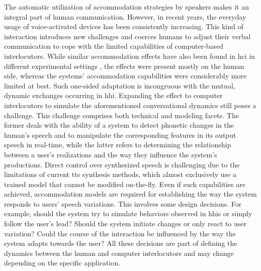 The automatic utilization of accommodation strategies by speakers makes it an integral part of human communication.
However, in recent years, the everyday usage of voice-activated devices has been consistently increasing.
This kind of interaction introduces new challenges and coerces humans to adjust their verbal communication to cope with the limited capabilities of computer-based interlocutors.
While similar accommodation effects have also been found in \acl{hci} in different experimental settings \citep[e.g.,][]{Bell2003prosodic, Levitan2013entrainment, Parent2010lexical}, the effects were present mostly on the human side, whereas the systems' accommodation capabilities were considerably more limited at best.
Such one-sided adaptation is incongruous with the mutual, dynamic exchanges occurring in \acl{hhi}.
Expanding the effect to computer interlocutors to simulate the aforementioned conversational dynamics still poses a challenge.
This challenge comprises both technical and modeling facets.
The former deals with the ability of a system to detect phonetic changes in the human's speech and to manipulate the corresponding features in its output speech in real-time, while the latter refers to determining the relationship between a user's realizations and the way they influence the system's productions.
Direct control over synthesized speech is challenging due to the limitations of current \acl{tts} synthesis methods, which almost exclusively use a trained model that cannot be modified on-the-fly.
Even if such capabilities are achieved, accommodation models are required for establishing the way the system responds to users' speech variations.
This involves some design decisions.
For example, should the system try to simulate behaviors observed in \aclp{hhi} or simply follow the user's lead?
Should the system initiate changes or only react to user variation?
Could the course of the interaction be influenced by the way the system adapts towards the user?
All these decisions are part of defining the dynamics between the human and computer interlocutors and may change depending on the specific application.

